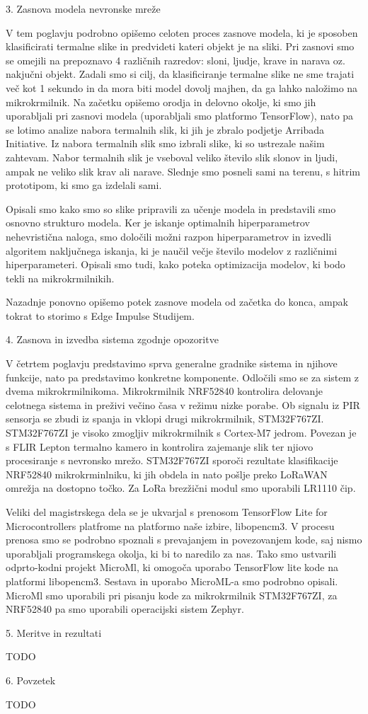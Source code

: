 {3. Zasnova modela nevronske mreže

V tem poglavju podrobno opišemo celoten proces zasnove modela, ki je sposoben klasificirati termalne slike in predvideti kateri objekt je na sliki.
Pri zasnovi smo se omejili na prepoznavo 4 različnih razredov: sloni, ljudje, krave in narava oz. nakjučni objekt. 
Zadali smo si cilj, da klasificiranje termalne slike ne sme trajati več kot 1 sekundo in da mora biti model dovolj majhen, da ga lahko naložimo na mikrokrmilnik.
Na začetku opišemo orodja in delovno okolje, ki smo jih uporabljali pri zasnovi modela (uporabljali smo platformo TensorFlow), nato pa se lotimo analize nabora termalnih slik, ki jih je zbralo podjetje Arribada Initiative.
Iz nabora termalnih slik smo izbrali slike, ki so ustrezale našim zahtevam.
Nabor termalnih slik je vseboval veliko število slik slonov in ljudi, ampak ne veliko slik krav ali narave.
Slednje smo posneli sami na terenu, s hitrim prototipom, ki smo ga izdelali sami.

Opisali smo kako smo so slike pripravili za učenje modela in predstavili smo osnovno strukturo modela.
Ker je iskanje optimalnih hiperparametrov nehevristična naloga, smo določili možni razpon hiperparametrov in izvedli algoritem naključnega iskanja, ki je naučil večje število modelov z različnimi hiperparameteri.
Opisali smo tudi, kako poteka optimizacija modelov, ki bodo tekli na mikrokrmilnikih.

Nazadnje ponovno opišemo potek zasnove modela od začetka do konca, ampak tokrat to storimo s Edge Impulse Studijem.
\newline

4. Zasnova in izvedba sistema zgodnje opozoritve

V četrtem poglavju predstavimo sprva generalne gradnike sistema in njihove funkcije, nato pa predstavimo konkretne komponente.
Odločili smo se za sistem z dvema mikrokrmilnikoma. 
Mikrokrmilnik NRF52840 kontrolira delovanje celotnega sistema in preživi večino časa v režimu nizke porabe.
Ob signalu iz PIR sensorja se zbudi iz spanja in vklopi drugi mikrokrmilnik, STM32F767ZI.
STM32F767ZI je visoko zmogljiv mikrokrmilnik s Cortex-M7 jedrom.
Povezan je s FLIR Lepton termalno kamero in kontrolira zajemanje slik ter njiovo procesiranje s nevronsko mrežo.
STM32F767ZI sporoči rezultate klasifikacije NRF52840 mikrokrminlniku, ki jih obdela in nato pošlje preko LoRaWAN omrežja na dostopno točko.
Za LoRa brezžični modul smo uporabili LR1110 čip.

Veliki del magistrskega dela se je ukvarjal s prenosom TensorFlow Lite for Microcontrollers platfrome na platformo naše izbire, libopencm3.
V procesu prenosa smo se podrobno spoznali s prevajanjem in povezovanjem kode, saj nismo uporabljali programskega okolja, ki bi to naredilo za nas.
Tako smo ustvarili odprto-kodni projekt MicroMl, ki omogoča uporabo TensorFlow lite kode na platformi libopencm3.
Sestava in uporabo MicroML-a smo podrobno opisali.
MicroMl smo uporabili pri pisanju kode za mikrokrmilnik STM32F767ZI, za NRF52840 pa smo uporabili operacijski sistem Zephyr.


5. Meritve in rezultati 

TODO

6. Povzetek

TODO
}
\newpage

